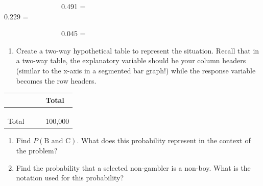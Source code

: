 \documentclass[
]{report}
\providecommand{\tightlist}{%
  \setlength{\itemsep}{0pt}\setlength{\parskip}{0pt}}
\begin{document}
~~~~~~~~~~~~~~~~0.491 = \vspace{.2in}\\
\hspace*{0.333em}\hspace*{0.333em}\hspace*{0.333em}\hspace*{0.333em}\hspace*{0.333em}\hspace*{0.333em}\hspace*{0.333em}\hspace*{0.333em}\hspace*{0.333em}\hspace*{0.333em}\hspace*{0.333em}\hspace*{0.333em}\hspace*{0.333em}\hspace*{0.333em}\hspace*{0.333em}\hspace*{0.333em}0.229 =

\vspace{.2in}

~~~~~~~~~~~~~~~~0.045 =

\vspace{.2in}

\begin{enumerate}
\def\labelenumi{\alph{enumi}.}
\setcounter{enumi}{2}
\tightlist
\item
  Create a two-way hypothetical table to represent the situation. Recall that in a two-way table, the explanatory variable should be your column headers (similar to the x-axis in a segmented bar graph!) while the response variable becomes the row headers.
\end{enumerate}

\begin{longtable}[]{@{}llll@{}}
\toprule
\hspace{1in} & \hspace{1in} & \hspace{1in} & Total\tabularnewline
\midrule
\endhead
\hspace{1in} & & &\tabularnewline
\hspace{1in} & & &\tabularnewline
\hspace{1in} & & &\tabularnewline
Total & & & 100,000\tabularnewline
\bottomrule
\end{longtable}

\begin{enumerate}
\def\labelenumi{\alph{enumi}.}
\setcounter{enumi}{3}
\item
  Find \(P(\mbox{B and C})\). What does this probability represent in the context of the problem?
  \vspace{1in}
\item
  Find the probability that a selected non-gambler is a non-boy. What is the notation used for this probability?
\end{enumerate}
\end{document}
